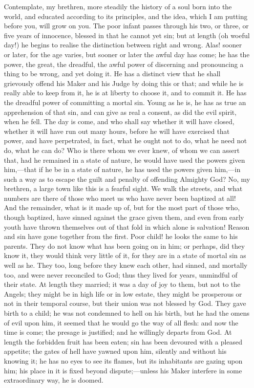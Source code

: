 Contemplate, my brethren, more steadily the history of a soul born
into the world, and educated according to its principles, and the
idea, which I am putting before you, will grow on you. The poor infant
passes through his two, or three, or five years of innocence, blessed
in that he cannot yet sin; but at length (oh woeful day!) he begins to
realise the distinction between right and wrong. Alas! sooner or
later, for the age varies, but sooner or later the awful day has come;
he has the power, the great, the dreadful, the awful power of
discerning and pronouncing a thing to be wrong, and yet doing it. He
has a distinct view that he shall grievously offend his Maker and his
Judge by doing this or that; and while he is really able to keep from
it, he is at liberty to choose it, and to commit it. He has the
dreadful power of committing a mortal sin. Young as he is, he has as
true an apprehension of that sin, and can give as real a consent, as
did the evil spirit, when he fell. The day is come, and who shall say
whether it will have closed, whether it will have run out many hours,
before he will have exercised that power, and have perpetrated, in
fact, what he ought not to do, what he need not do, what he can do?
Who is there whom we ever knew, of whom we can assert that, had he
remained in a state of nature, he would have used the powers given
him,—that if he be in a state of nature, he has used the powers
given him,—in such a way as to escape the guilt and penalty of
offending Almighty God? No, my brethren, a large town like this is a
fearful sight. We walk the streets, and what numbers are there of
those who meet us who have never been baptized at all! And the
remainder, what is it made up of, but for the most part of those who,
though baptized, have sinned against the grace given them, and even
from early youth have thrown themselves out of that fold in which
alone is salvation! Reason and sin have gone together from the first.
Poor child! he looks the same to his parents. They do not know what
has been going on in him; or perhaps, did they know it, they would
think very little of it, for they are in a state of mortal sin as well
as he. They too, long before they knew each other, had sinned, and
mortally too, and were never reconciled to God; thus they lived for
years, unmindful of their state. At length they married; it was a day
of joy to them, but not to the Angels; they might be in high life or
in low estate, they might be prosperous or not in their temporal
course, but their union was not blessed by God. They gave birth to a
child; he was not condemned to hell on his birth, but he had the omens
of evil upon him, it seemed that he would go the way of all flesh: and
now the time is come; the presage is justified; and he willingly
departs from God. At length the forbidden fruit has been eaten; sin
has been devoured with a pleased appetite; the gates of hell have
yawned upon him, silently and without his knowing it; he has no eyes
to see its flames, but its inhabitants are gazing upon him; his place
in it is fixed beyond dispute;—unless his Maker interfere in some
extraordinary way, he is doomed.

